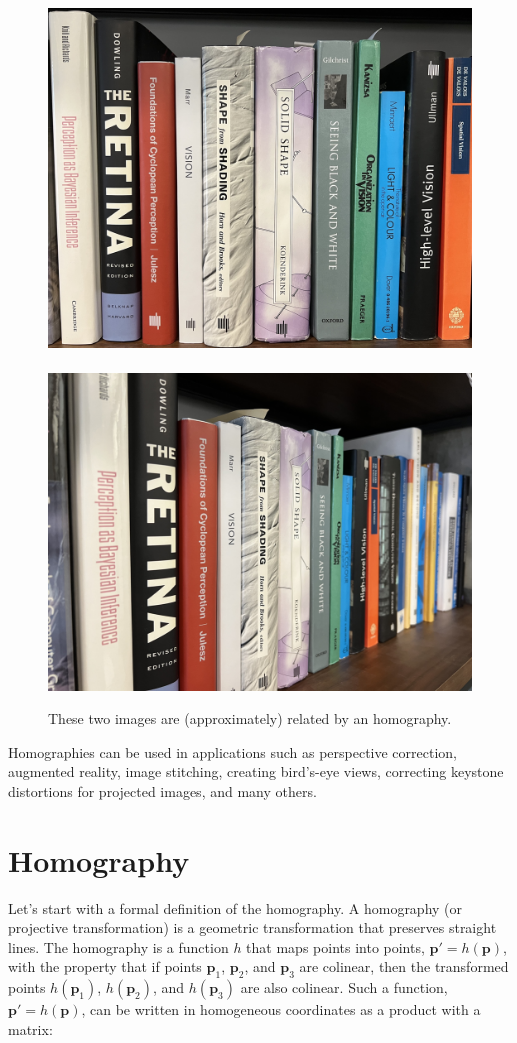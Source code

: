 \begin{figure}[h!]
\centerline{
\includegraphics[width=.455\linewidth]{figures/homography/IMG_7801_crop.jpg}
~~
\includegraphics[width=.49\linewidth]{figures/homography/IMG_7802_crop.jpg}
}
\caption{These two images are (approximately) related by an homography.}
\label{fig:illustration_homography}
\end{figure}

Homographies can be used in applications such as perspective correction, augmented reality, image stitching, creating bird's-eye views, correcting keystone distortions for projected images, and many others. 

    
\section{Homography}

Let's start with a formal definition of the homography. A homography (or projective transformation) is a geometric transformation that preserves straight lines. 
The homography is a function $h$ that maps points into points, $\mathbf{p}' = h(\mathbf{p})$, with the property that if points  $\mathbf{p}_1$, $\mathbf{p}_2$, and $\mathbf{p}_3$ are colinear, then the transformed points $h(\mathbf{p}_1)$, $h(\mathbf{p}_2)$, and $h(\mathbf{p}_3)$ are also colinear. Such a function,  $\mathbf{p}' = h(\mathbf{p})$, can be written in homogeneous coordinates as a product with a matrix:

